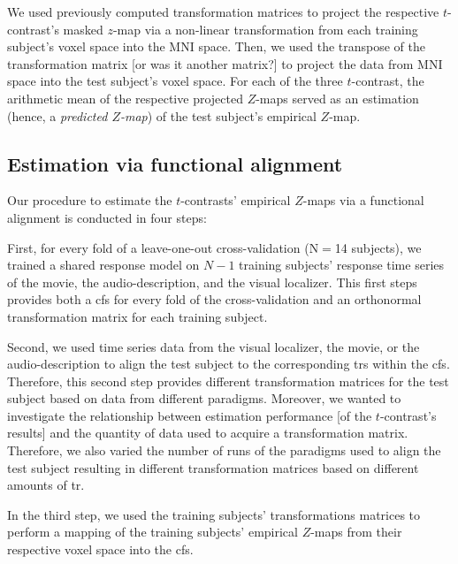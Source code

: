 We used previously computed transformation matrices
\citep[][\href{https://github.com/psychoinformatics-de/studyforrest-data-templatetransforms}{\url{github.com/psychoinformatics-de/studyforrest-data-templatetransforms}}]{hanke2014audiomovie}
to project the respective $t$-contrast's masked $z$-map via a non-linear
transformation from each training subject's voxel space into the MNI space.
Then, we  used the transpose of the transformation matrix [or was it another
matrix?] to project the data from MNI space into the test subject's voxel space.
For each of the three $t$-contrast, the arithmetic mean of the respective
projected $Z$-maps served as an estimation (hence, a \textit{predicted $Z$-map})
of the test subject's empirical $Z$-map.



\subsection{Estimation via functional alignment}
%
Our procedure to estimate the $t$-contrasts' empirical $Z$-maps via a functional
alignment is conducted in four steps:

First, for every fold of a leave-one-out cross-validation (N$=$14 subjects), we
trained a shared response model on $N-1$ training subjects' response time series
of the movie, the audio-description, and the visual localizer.
This first steps provides both a \ac{cfs} for every fold of the cross-validation
and an orthonormal transformation matrix for each training subject.

Second, we used time series data from the visual localizer, the movie, or the
audio-description to align the test subject to the corresponding \acp{tr} within
the \ac{cfs}.
%
Therefore, this second step provides different transformation matrices for the
test subject based on data from different paradigms.
Moreover, we wanted to investigate the relationship between estimation
performance [of the $t$-contrast's results] and the quantity of data used to
acquire a transformation matrix.
Therefore, we also varied the number of runs of the paradigms used to align the
test subject resulting in different transformation matrices based on different
amounts of \ac{tr}.

In the third step, we used the training subjects' transformations matrices to
perform a mapping of the training subjects' empirical $Z$-maps from their
respective voxel space into the \ac{cfs}.

